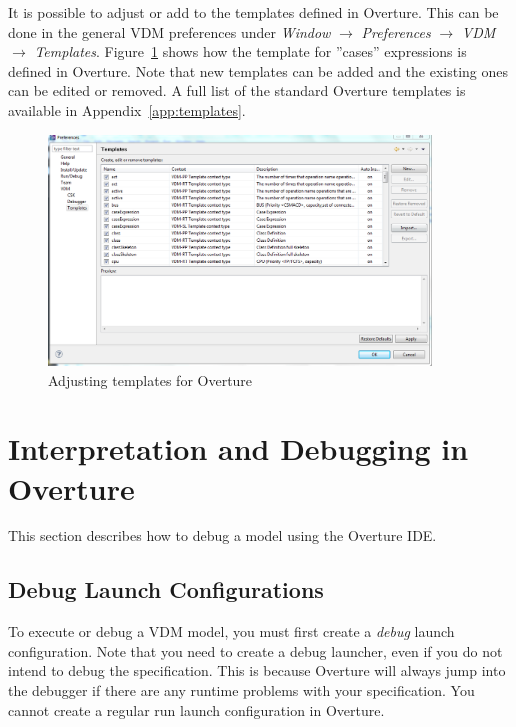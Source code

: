 \documentclass{overturerepchap}
\begin{document}
It is possible to adjust or add to the templates defined in 
Overture. This can be done in the general VDM preferences under
\emph{Window} $\rightarrow$ \emph{Preferences} $\rightarrow$ \emph{VDM}
$\rightarrow$ \emph{Templates}. Figure~\ref{fig:Templatepreferences} shows
how the template for ''cases'' expressions is defined in Overture. Note
that new templates can be added and the existing ones can be
edited or removed. A full list of the
standard Overture templates is available in Appendix~\ref{app:templates}.

\begin{figure}
\begin{center}
\includegraphics[width=4in]{screendumps/templatesRT}
\caption{Adjusting templates for Overture}
\label{fig:Templatepreferences}
\end{center}
\end{figure}

\chapter{Interpretation and Debugging in Overture}\label{sec:debug}

This section describes how to debug a model using the Overture IDE. 

\section{Debug Launch Configurations}

To execute or debug a VDM model, you must first create a \emph{debug} launch
configuration. Note that you need to create a debug
launcher, even if you do not intend to debug the specification. This is because
Overture will always jump into the debugger if there are any runtime problems
with your specification. You cannot create a regular run launch configuration
in Overture.
\end{document}
